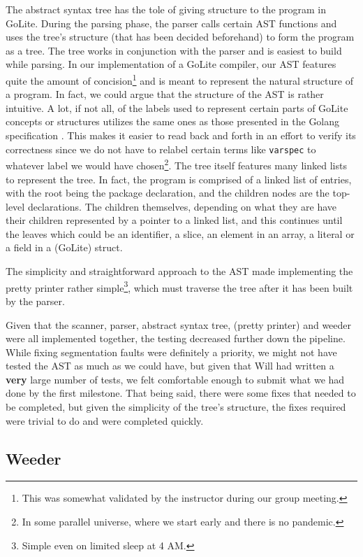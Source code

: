 \documentclass{article}
\begin{document}
The abstract syntax tree has the tole of giving structure to the program in GoLite. During the parsing phase, the parser calls certain AST functions and uses the tree's structure (that has been decided beforehand) to form the program as a tree. The tree works in conjunction with the parser and is easiest to build while parsing. In our implementation of a GoLite compiler, our AST features quite the amount of concision\footnote{This was somewhat validated by the instructor during our group meeting.} and is meant to represent the natural structure of a program. In fact, we could argue that the structure of the AST is rather intuitive. A lot, if not all, of the labels used to represent certain parts of GoLite concepts or structures utilizes the same ones as those presented in the Golang specification \cite{gospec}. This makes it easier to read back and forth in an effort to verify its correctness since we do not have to relabel certain terms like \texttt{varspec} to whatever label we would have chosen\footnote{In some parallel universe, where we start early and there is no pandemic.}. The tree itself features many linked lists to represent the tree. In fact, the program is comprised of a linked list of entries, with the root being the package declaration, and the children nodes are the top-level declarations. The children themselves, depending on what they are have their children represented by a pointer to a linked list, and this continues until the leaves which could be an identifier, a slice, an element in an array, a literal or a field in a (GoLite) struct.

The simplicity and straightforward approach to the AST made implementing the pretty printer rather simple\footnote{Simple even on limited sleep at 4 AM.}, which must traverse the tree after it has been built by the parser.

Given that the scanner, parser, abstract syntax tree, (pretty printer) and weeder were all implemented together, the testing decreased further down the pipeline. While fixing segmentation faults were definitely a priority, we might not have tested the AST as much as we could have, but given that Will had written a \textbf{very} large number of tests, we felt comfortable enough to submit what we had done by the first milestone. That being said, there were some fixes that needed to be completed, but given the simplicity of the tree's structure, the fixes required were trivial to do and were completed quickly.

\subsection{Weeder}
\end{document}
